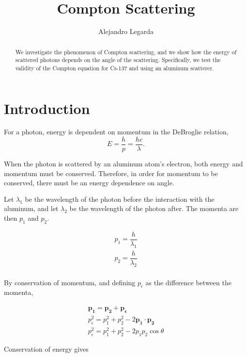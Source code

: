 \documentclass{article}
\title{Compton Scattering}
\author{Alejandro Legarda}
\renewcommand{\vec}[1]{\mathbf{#1}}
\begin{document}
\raggedright
\maketitle

\begin{abstract}
	We investigate the phenomenon of Compton scattering, and we show how the energy of scattered photons depends on the angle of the scattering. Specifically, we test the validity of the Compton equation for Cs-137 and using an aluminum scatterer.
\end{abstract}
	
	
\tableofcontents
\newpage

\section{Introduction}

For a photon, energy is dependent on momentum in the DeBroglie relation,
\begin{equation*}
	E = \frac{h}{p} = \frac{hc}{\lambda}.
\end{equation*}

When the photon is scattered by an aluminum atom's electron, both energy and momentum must be conserved. Therefore, in order for momentum to be conserved, there must be an energy dependence on angle.

\hspace{.25cm}

Let $\lambda_1$ be the wavelength of the photon before the interaction with the aluminum, and let $\lambda_2$ be the wavelength of the photon after. The momenta are then $p_1$ and $p_2$.

\begin{gather}
	p_1 = \dfrac{h}{\lambda_1}\\
	p_2 = \dfrac{h}{\lambda_2}\\
\end{gather}

By conservation of momentum, and defining $p_\epsilon$ as the difference between the momenta,

\begin{gather}
	\vec{p_1} = \vec{p_2}+\vec{p_{\epsilon}}\\
	p_{\epsilon}^2 = p_1^2 + p_2^2 - 2\vec{p_1} \cdot \vec{p_2}\\
	p_{\epsilon}^2 = p_1^2 + p_2^2 - 2p_1p_2\cos\theta
\end{gather}

Conservation of energy gives
\end{document}

